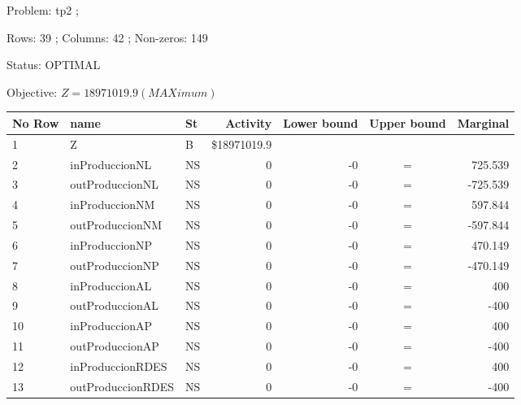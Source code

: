 \documentclass[a4paper,10pt]{article}
\begin{document}
Problem:     tp2 ;

Rows:        39  ; Columns:     42 ; Non-zeros:   149 

Status:      OPTIMAL 

Objective:   $Z    =   18971019.9    (MAXimum) $

\begin{flushleft}
 
 \begin{tabular}{| l  l  l  r  r  c  r |}
    \hline
    No Row &   name &     St &     Activity &       Lower bound &     Upper bound &      Marginal  \\ \hline
    \hline
      1 &   Z &              B &       \$18971019.9 &               &			&		 \\ 
      2 &   inProduccionNL &         NS &               0 &              -0 &               = &         725.539  \\ 
      3 &   outProduccionNL &      NS &               0 &              -0 &               = &           -725.539 \\ 
      4 &   inProduccionNM &         NS &               0 &              -0 &               = &         597.844 \\ 
      5 &   outProduccionNM &      NS &               0 &              -0 &               = &           -597.844 \\ 
      6 &   inProduccionNP &         NS &               0 &              -0 &               = &         470.149 \\ 
      7 &   outProduccionNP &      NS &               0 &              -0 &               = &           -470.149 \\ 
      8 &   inProduccionAL &         NS &               0 &              -0 &               = &             400 \\ 
      9 &   outProduccionAL &      NS &               0 &              -0 &               = &           -400 \\ 
     10 &   inProduccionAP &         NS &               0 &              -0 &               = &             400 \\ 
     11 &   outProduccionAP &      NS &               0 &              -0 &               = &           -400 \\ 
     12 &   inProduccionRDES &       NS &               0 &              -0 &               = &             400 \\ 
     13 &   outProduccionRDES &    NS &               0 &              -0 &               = &           -400 \\ 

\end{tabular}
\end{flushleft}
\end{document}
